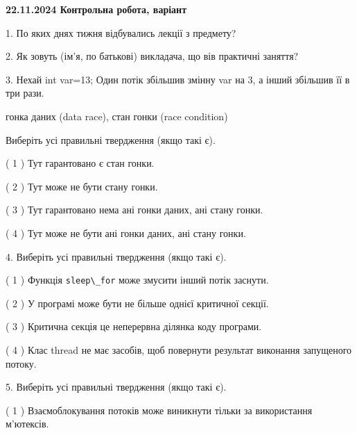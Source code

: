 \documentclass[12pt, ukrainian]{article}
\def\code#1{\Verb!#1!}
\begin{document}
\vspace{4mm}
\newpage
\begin {large}

\textbf{22.11.2024 Контрольна робота, варіант  }\par


{
1. По яких днях тижня відбувались лекції з предмету?



\vspace{5mm}
2. Як зовуть (ім'я, по батькові) викладача, що вів практичні заняття?



\vspace{5mm}
3. Нехай int var=13; Один потік збільшив змінну var на 3, а інший збільшив її в три рази.

гонка даних (data race), стан гонки (race condition)

Виберіть усі правильні твердження (якщо такі є).\par
\vspace{2mm}
( 1 ) Тут гарантовано є стан гонки.%

( 2 ) Тут може не бути стану гонки.%

( 3 ) Тут гарантовано нема ані гонки даних, ані стану гонки.%

( 4 ) Тут може не бути ані гонки даних, ані стану гонки.%


\vspace{5mm}
4. Виберіть усі правильні твердження (якщо такі є).\par
\vspace{2mm}

( 1 ) Функція \code{sleep\_for} може змусити інший потік заснути.%

( 2 ) У програмі може бути не більше однієї критичної секції.%

( 3 ) Критична секція це неперервна ділянка коду програми.%

( 4 ) Клас thread не має засобів, щоб повернути результат виконання запущеного потоку.%


\vspace{5mm}
5. Виберіть усі правильні твердження (якщо такі є).\par
\vspace{2mm}

( 1 ) Взаємоблокування потоків може виникнути тільки за використання м’ютексів.%

}
\end{large}
\end{document}
